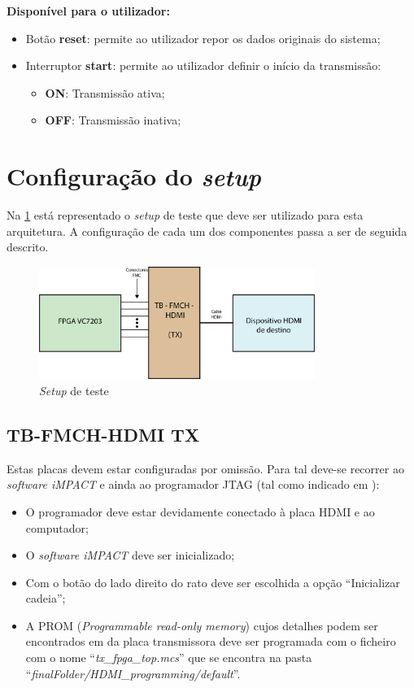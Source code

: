 \documentclass[11pt,a4paper]{article}
\begin{document}
	\textbf{Disponível para o utilizador:}
	\begin{itemize}
		\item Botão \textbf{reset}: permite ao utilizador repor os dados originais do sistema;
		\item Interruptor \textbf{start}: permite ao utilizador definir o início da transmissão:
		\begin{itemize}
			\item \textbf{ON}: Transmissão ativa;
			\item \textbf{OFF}: Transmissão inativa;
		\end{itemize}
	\end{itemize}

	\section{Configuração do \textit{setup}}
	
	Na \cref{fig:setupA} está representado o \textit{setup} de teste que deve ser utilizado para esta arquitetura. A configuração de cada um dos componentes passa a ser de seguida descrito.
	
		\begin{figure}[h!]
		\begin{center}
			\includegraphics[width=0.8\textwidth]{planAsch} 
			\caption{\textit{Setup} de teste}
			\label{fig:setupA}
		\end{center}
	\end{figure}

	\subsection{TB-FMCH-HDMI TX}
	Estas placas devem estar configuradas por omissão. Para tal deve-se recorrer ao \textit{software iMPACT} e ainda ao programador JTAG (tal como indicado em \cite{R025}):
	\begin{itemize}
		\item O programador deve estar devidamente conectado à placa HDMI e ao computador;
		\item O \textit{software iMPACT} deve ser inicializado;
		\item Com o botão do lado direito do rato deve ser escolhida a opção ``Inicializar cadeia'';
		\item A PROM (\textit{Programmable read-only memory}) cujos detalhes podem ser encontrados em \cite{R026} da placa transmissora deve ser programada com o ficheiro com o nome ``\textit{tx\_fpga\_top.mcs}'' que se encontra na pasta ``\textit{finalFolder/HDMI\_programming/default}''.
	\end{itemize}
	
\end{document}
